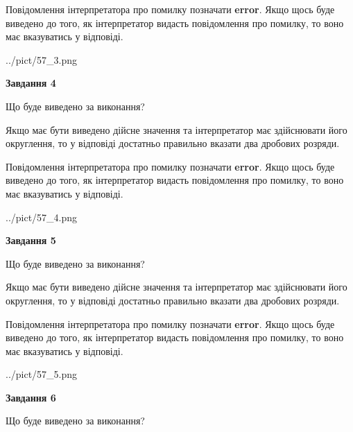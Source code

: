 \documentclass[12pt, ukrainian]{article}
\begin{document}
{\begin {Large}
Повідомлення інтерпретатора про помилку позначати \textbf{error}.
Якщо щось буде виведено до того, як інтерпретатор видасть повідомлення про помилку, 
то воно має вказуватись у відповіді. \par

\begin{center}
	{../pict/57_3.png}
\end{center}
\newpage

{\begin {center}\textbf{Завдання 4}\end {center}}\par
Що буде виведено за виконання? \par

Якщо має бути виведено дійсне значення та інтерпретатор має здійснювати його округлення, 
то у відповіді достатньо правильно вказати два дробових розряди.

Повідомлення інтерпретатора про помилку позначати \textbf{error}.
Якщо щось буде виведено до того, як інтерпретатор видасть повідомлення про помилку, 
то воно має вказуватись у відповіді. \par

\begin{center}
	{../pict/57_4.png}
\end{center}
\newpage

{\begin {center}\textbf{Завдання 5}\end {center}}\par
Що буде виведено за виконання? \par

Якщо має бути виведено дійсне значення та інтерпретатор має здійснювати його округлення, 
то у відповіді достатньо правильно вказати два дробових розряди.

Повідомлення інтерпретатора про помилку позначати \textbf{error}.
Якщо щось буде виведено до того, як інтерпретатор видасть повідомлення про помилку, 
то воно має вказуватись у відповіді. \par

\begin{center}
	{../pict/57_5.png}
\end{center}
\newpage

{\begin {center}\textbf{Завдання 6}\end {center}}\par
Що буде виведено за виконання? \par


\end{Large}}
\end{document}
